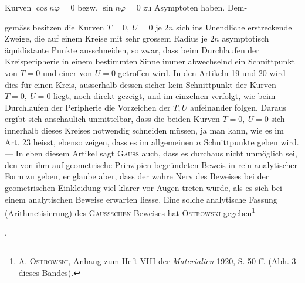 Kurven \(\cos n\varphi=0\) bezw. \(\sin n\varphi=0\) zu Asymptoten haben. Dem-\par
\clearpage{}
\noindent gemäss besitzen die Kurven \(T=0,\ U=0\) je \(2n\) sich ins Unendliche erstreckende
Zweige, die auf einem Kreise mit sehr grossem Radius je \(2n\)
asymptotisch äquidistante Punkte ausschneiden, so zwar, dass beim Durchlaufen
der Kreisperipherie in einem bestimmten Sinne immer abwechselnd ein Schnittpunkt
von \(T=0\) und einer von \(U=0\) getroffen wird. In den Artikeln 19 und
20 wird dies für einen Kreis, ausserhalb dessen sicher kein Schnittpunkt der
Kurven \(T=0,\ U=0\) liegt, noch direkt gezeigt, und im einzelnen verfolgt,
wie beim Durchlaufen der Peripherie die Vorzeichen der \(T,U\) aufeinander
folgen. Daraus ergibt sich anschaulich unmittelbar, dass die beiden Kurven
\(T=0,\ U=0\) sich innerhalb dieses Kreises notwendig schneiden müssen, ja
man kann, wie es im Art. 23 heisst, ebenso zeigen, dass es im allgemeinen
\(n\) Schnittpunkte geben wird. — In eben diesem Artikel sagt \textsc{Gauss} auch,
dass es durchaus nicht unmöglich sei, den von ihm auf geometrische Prinzipien
begründeten Beweis in rein analytischer Form zu geben, er glaube
aber, dass der wahre Nerv des Beweises bei der geometrischen Einkleidung
viel klarer vor Augen treten würde, als es sich bei einem analytischen Beweise
erwarten liesse. Eine solche analytische Fassung (Arithmetisierung) des
\textsc{Gaussschen} Beweises hat \textsc{Ostrowski} gegeben\begingroup\renewcommand{\thefootnote}{79a)}\footnote{\textsc{A. Ostrowski}, Anhang zum Heft VIII der \textit{Materialien} 1920, S. 50 ff. (Abh. 3 dieses Bandes).}\endgroup\addtocounter{footnote}{-1}.


